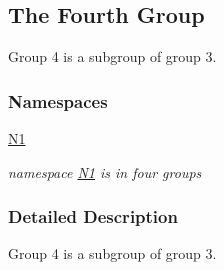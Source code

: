 \hypertarget{group__group4}{}\subsection{The Fourth Group}
\label{group__group4}


Group 4 is a subgroup of group 3.  


\subsubsection*{Namespaces}
\begin{DoxyCompactItemize}
\item 
 \hyperlink{namespace_n1}{N1}
\begin{DoxyCompactList}\small\item\em namespace \hyperlink{namespace_n1}{N1} is in four groups \end{DoxyCompactList}\end{DoxyCompactItemize}


\subsubsection{Detailed Description}
Group 4 is a subgroup of group 3. 

